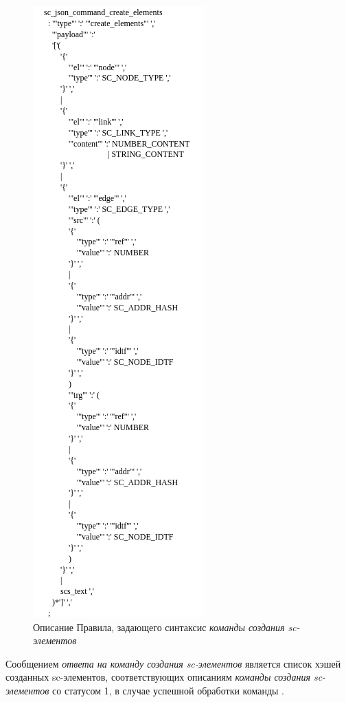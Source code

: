 \begin{figure}[htbp]
	\center
	\includegraphics[scale=0.8]{author/part6/figures/create_elements_command.png}
	\caption{Описание Правила, задающего синтаксис \textit{команды создания sc-элементов}}
	\label{fig:create_elements_command}
\end{figure}

Сообщением \textit{ответа на команду создания sc-элементов} является список хэшей созданных sc-элементов, соответствующих описаниям \textit{команды создания sc-элементов} со статусом 1, в случае успешной обработки команды .

